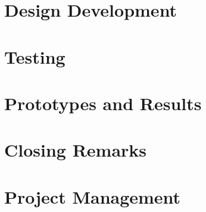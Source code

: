 \documentclass[en, screen, 12pt]{report}
\begin{document}
\chapter{Design Development}







\chapter{Testing}





\chapter{Prototypes and Results}

\chapter{Closing Remarks}


\chapter{Project Management}

\appendix



\newpage
\printbibliography

\end{document}
